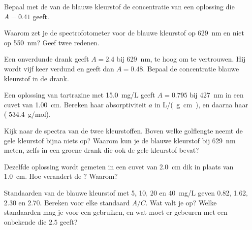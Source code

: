\begin{exercise}[$\star\star$]\label{exo:g11:absorbance:6}
Bepaal met de  van de blauwe kleurstof de concentratie van een
oplossing die $A = 0.41$ geeft.
\end{exercise}

\begin{exercise}[$\star\star$]\label{exo:g11:absorbance:7}
Waarom zet je de spectrofotometer voor de blauwe kleurstof op
\qty{629}{nm} en niet op \qty{550}{nm}? Geef twee redenen.
\end{exercise}

\begin{exercise}[$\star\star$]\label{exo:g11:absorbance:8}
Een onverdunde drank geeft $A = 2.4$ bij \qty{629}{nm}, te hoog om te
vertrouwen. Hij wordt vijf keer verdund en geeft dan $A = 0.48$. Bepaal
de concentratie blauwe kleurstof in de drank.
\end{exercise}

\begin{exercise}[$\star\star$]\label{exo:g11:absorbance:9}
Een oplossing van tartrazine met \qty{15.0}{mg/L} geeft $A = 0.795$ bij
\qty{427}{nm} in een cuvet van \qty{1.00}{cm}. Bereken haar
absorptiviteit $a$ in \si{L/(g.cm)}, en daarna haar  ( \qty{534.4}{g/mol}).
\end{exercise}

\begin{exercise}[$\star\star$]\label{exo:g11:absorbance:10}
Kijk naar de spectra van de twee kleurstoffen. Boven welke golflengte
neemt de gele kleurstof bijna niets op? Waarom kun je de blauwe kleurstof
bij \qty{629}{nm} meten, zelfs in een groene drank die ook de gele
kleurstof bevat?
\end{exercise}

\begin{exercise}[$\star\star$]\label{exo:g11:absorbance:11}
Dezelfde oplossing wordt gemeten in een cuvet van \qty{2.0}{cm} dik in
plaats van \qty{1.0}{cm}. Hoe verandert de ? Waarom?
\end{exercise}

\begin{exercise}[$\star\star\star$]\label{exo:g11:absorbance:12}
Standaarden van de blauwe kleurstof met 5, 10, 20 en \qty{40}{mg/L} geven
0.82, 1.62, 2.30 en 2.70. Bereken voor elke standaard $A / C$. Wat valt je
op? Welke standaarden mag je voor een  gebruiken, en wat moet er
gebeuren met een onbekende die $2.5$ geeft?
\end{exercise}

